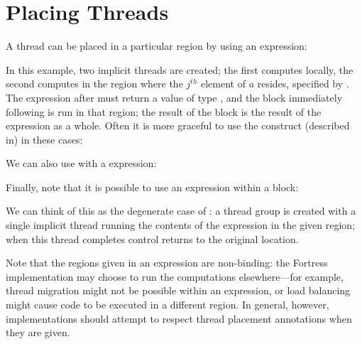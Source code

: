 %
%
%
%

\section{Placing Threads}

A thread can be placed in a particular region by using an 
expression:


In this example, two implicit threads are created; the first computes
 locally, the second computes  in the region where
the $j^{th}$ element of $a$ resides, specified by
.  The expression after  must return a
value of type , and the block immediately following
 is run in that region; the result of the block is the result
of the  expression as a whole.  Often it is more graceful to
use the  construct
(described in)
in these cases:


We can also use  with a  expression:


Finally, note that it is possible to use an  expression within
a block:

We can think of this as the degenerate case of : a thread group is created with a single implicit thread
running the contents of the  expression in the given region; when
this thread completes control returns to the original location.

Note that the regions given in an  expression are non-binding:
the Fortress implementation may choose to run the computations
elsewhere---for example, thread migration might not be possible within
an  expression, or load balancing might cause code to be
executed in a different region.  In general, however, implementations
should attempt to respect thread placement annotations when they are
given.

